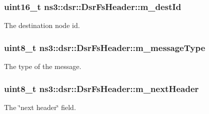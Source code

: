 \subsubsection[{\texorpdfstring{m\+\_\+dest\+Id}{m_destId}}]{\setlength{\rightskip}{0pt plus 5cm}uint16\+\_\+t ns3\+::dsr\+::\+Dsr\+Fs\+Header\+::m\+\_\+dest\+Id\hspace{0.3cm}{\ttfamily [private]}}\hypertarget{classns3_1_1dsr_1_1DsrFsHeader_a4b5e5ccb8af3e9a246e31c9393ed7036}{}\label{classns3_1_1dsr_1_1DsrFsHeader_a4b5e5ccb8af3e9a246e31c9393ed7036}


The destination node id. 

\subsubsection[{\texorpdfstring{m\+\_\+message\+Type}{m_messageType}}]{\setlength{\rightskip}{0pt plus 5cm}uint8\+\_\+t ns3\+::dsr\+::\+Dsr\+Fs\+Header\+::m\+\_\+message\+Type\hspace{0.3cm}{\ttfamily [private]}}\hypertarget{classns3_1_1dsr_1_1DsrFsHeader_a86fd12b9ad8f826549447d2257c2961e}{}\label{classns3_1_1dsr_1_1DsrFsHeader_a86fd12b9ad8f826549447d2257c2961e}


The type of the message. 

\subsubsection[{\texorpdfstring{m\+\_\+next\+Header}{m_nextHeader}}]{\setlength{\rightskip}{0pt plus 5cm}uint8\+\_\+t ns3\+::dsr\+::\+Dsr\+Fs\+Header\+::m\+\_\+next\+Header\hspace{0.3cm}{\ttfamily [private]}}\hypertarget{classns3_1_1dsr_1_1DsrFsHeader_ad8aa1ce25a4d8d8d994351fffd51dac1}{}\label{classns3_1_1dsr_1_1DsrFsHeader_ad8aa1ce25a4d8d8d994351fffd51dac1}


The \char`\"{}next header\char`\"{} field. 

